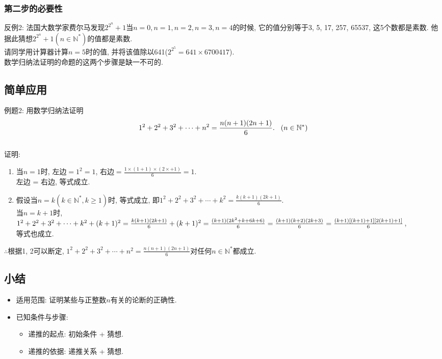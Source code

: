 \documentclass{article}
\begin{document}
\begin{CJK}{UTF8}{gkai}
\subsubsection{第二步的必要性}
反例2: 法国大数学家费尔马发现$2^{2^n} + 1$当$n=0, n=1, n=2, n=3, n=4$的时候, 它的值分别等于3, 5, 17, 257, 65537, 这5个数都是素数. 他据此猜想$2^{2^n} + 1(n \in \mathbb{N}^*)$的值都是素数.\\
请同学用计算器计算$n = 5$时的值, 并将该值除以641($2^{2^5} = 641 \times 6700417$).
\\[2ex]数学归纳法证明的命题的这两个步骤是缺一不可的.

\subsection{简单应用}
例题2: 用数学归纳法证明
$$1^2 + 2^2 + 3^2 + \cdots + n^2 = \frac{n(n + 1)(2n + 1)}{6}.\hspace{3mm}(n \in \mathbb{N}^*)$$
\\证明: 
\begin{enumerate}[i]
\item 当$n = 1$时, 左边$= 1^2 = 1$, 右边$= \frac{1 \times (1 + 1) \times (2 \times + 1)}{6} = 1$.\\左边 = 右边, 等式成立.
\item 假设当$n = k (k \in \mathbb{N}^*, k \ge 1)$时, 等式成立, 即$1^2 + 2^2 + 3^2 + \cdots + k^2 = \frac{k(k + 1)(2k + 1)}{6}.$
\\当$n = k + 1$时, \\$1^2 + 2^2 + 3^2 + \cdots + k^2 + (k + 1)^2\\= \frac{k(k + 1)(2k + 1)}{6} + (k+1)^2\\= \frac{(k + 1)(2k^2 + k + 6k +6)}{6}\\= \frac{(k + 1)(k + 2)(2k + 3)}{6}\\= \frac{(k + 1)[(k + 1) + 1][2(k + 1) + 1]}{6}$, \\等式也成立.
\end{enumerate}
$\therefore$根据1, 2可以断定, $1^2 + 2^2 + 3^2 + \cdots + n^2 = \frac{n(n + 1)(2n + 1)}{6}$对任何$n \in \mathbb{N}^*$都成立.

\subsection{小结}
\begin{itemize}
\item 适用范围: 证明某些与正整数$n$有关的论断的正确性.
\item 已知条件与步骤:
\begin{itemize}
\item 递推的起点: 初始条件 + 猜想.
\item 递推的依据: 递推关系 + 猜想.
\end{itemize}
\end{itemize}


\end{CJK}
\end{document}
